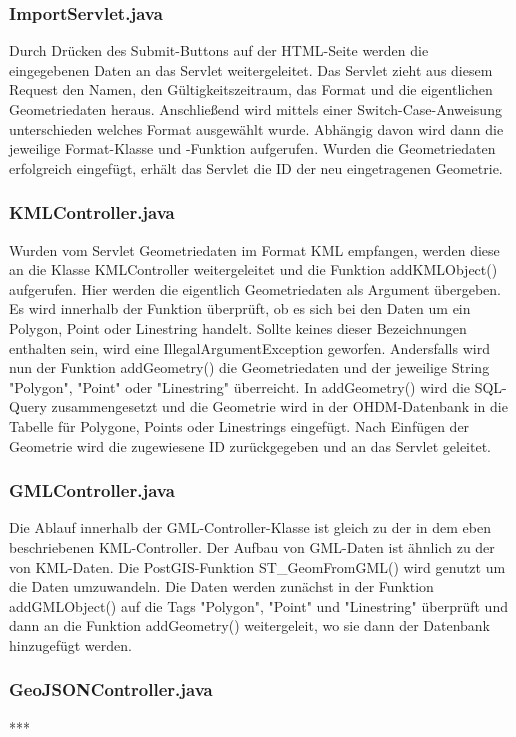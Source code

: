 \documentclass[]{article}
\begin{document}
\subsubsection{ImportServlet.java}
Durch Drücken des Submit-Buttons auf der HTML-Seite werden die eingegebenen Daten an das Servlet weitergeleitet. Das Servlet zieht aus diesem Request den Namen, den Gültigkeitszeitraum, das Format und die eigentlichen Geometriedaten heraus. Anschließend wird mittels einer Switch-Case-Anweisung unterschieden welches Format ausgewählt wurde. Abhängig davon wird dann die jeweilige Format-Klasse und -Funktion aufgerufen. Wurden die Geometriedaten erfolgreich eingefügt, erhält das Servlet die ID der neu eingetragenen Geometrie.

\subsubsection{KMLController.java}
Wurden vom Servlet Geometriedaten im Format KML empfangen, werden diese an die Klasse KMLController weitergeleitet und die Funktion addKMLObject() aufgerufen. Hier werden die eigentlich Geometriedaten als Argument übergeben. Es wird innerhalb der Funktion überprüft, ob es sich bei den Daten um ein Polygon, Point oder Linestring handelt. Sollte keines dieser Bezeichnungen enthalten sein, wird eine IllegalArgumentException geworfen. Andersfalls wird nun der Funktion addGeometry() die Geometriedaten und der jeweilige String "Polygon", "Point" oder "Linestring" überreicht. In addGeometry() wird die SQL-Query zusammengesetzt und die Geometrie wird in der OHDM-Datenbank in die Tabelle für Polygone, Points oder Linestrings eingefügt. Nach Einfügen der Geometrie wird die zugewiesene ID zurückgegeben und an das Servlet geleitet.

\subsubsection{GMLController.java}
Die Ablauf innerhalb der GML-Controller-Klasse ist gleich zu der in dem eben beschriebenen KML-Controller. Der Aufbau von GML-Daten ist ähnlich zu der von KML-Daten. Die PostGIS-Funktion ST\_GeomFromGML() wird genutzt um die Daten umzuwandeln. Die Daten werden zunächst in der Funktion addGMLObject() auf die Tags "Polygon", "Point" und "Linestring" überprüft und dann an die Funktion addGeometry() weitergeleit, wo sie dann der Datenbank hinzugefügt werden.

\subsubsection{GeoJSONController.java}
***
\end{document}
